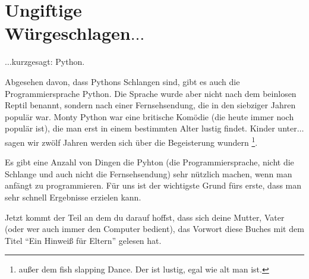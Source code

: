 \section{Ungiftige\\Würgeschlagen$\ldots$}

$\ldots$kurzgesagt: Python.

Abgesehen davon, dass Pythons Schlangen sind, gibt es auch die Programmiersprache Python. Die Sprache wurde aber nicht nach dem beinlosen Reptil benannt, sondern nach einer Fernsehsendung, die in den siebziger Jahren populär war. Monty Python war eine britische Komödie (die heute immer noch populär ist), die man erst in einem bestimmten Alter lustig findet. Kinder unter$\ldots$ sagen wir zwölf Jahren werden sich über die Begeisterung wundern \footnote{außer dem fish slapping Dance. Der ist lustig, egal wie alt man ist.}.

Es gibt eine Anzahl von Dingen die Pyhton (die Programmiersprache, nicht die Schlange und auch nicht die Fernsehsendung) sehr nützlich machen, wenn man anfängt zu programmieren. Für uns ist der wichtigste Grund fürs erste, dass man sehr schnell Ergebnisse erzielen kann.

Jetzt kommt der Teil an dem du darauf hoffst, dass sich deine Mutter, Vater (oder wer auch immer den Computer bedient), das Vorwort diese Buches mit dem Titel ``Ein Hinweiß für Eltern'' gelesen hat.

